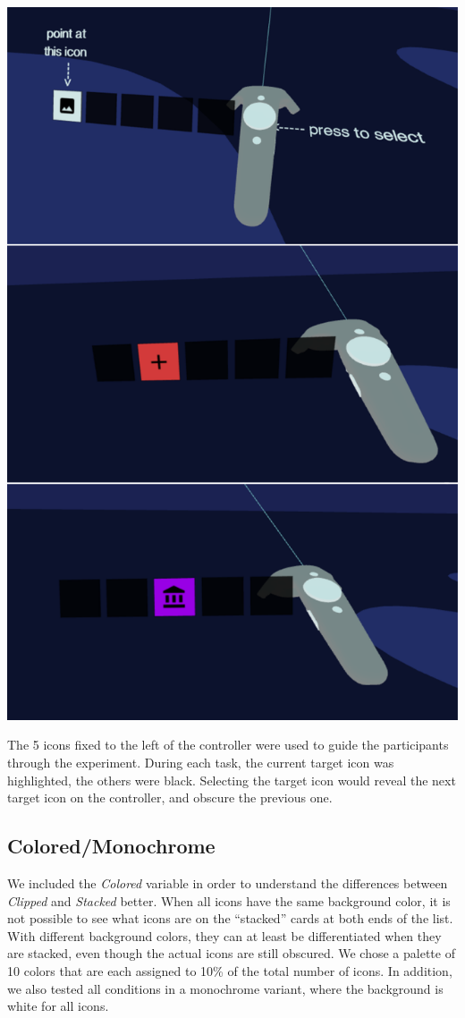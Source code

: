 \documentclass[nobib]{tufte-book} %
\begin{document}
\begin{marginfigure}
  \includegraphics[width=\linewidth]{controllers.png}
  \caption{The 5 icons fixed to the left of the controller were used to guide the participants through the experiment. During each task, the current target icon was highlighted, the others were black. Selecting the target icon would reveal the next target icon on the controller, and obscure the previous one.}
  \label{fig:controllers}
\end{marginfigure}

\subsection{Colored/Monochrome}
We included the \emph{Colored} variable in order to understand the differences between \emph{Clipped} and \emph{Stacked} better. When all icons have the same background color, it is not possible to see what icons are on the ``stacked'' cards at both ends of the list. With different background colors, they can at least be differentiated when they are stacked, even though the actual icons are still obscured. We chose a palette of 10 colors that are each assigned to 10\% of the total number of icons. In addition, we also tested all conditions in a monochrome variant, where the background is white for all icons.
\end{document}
